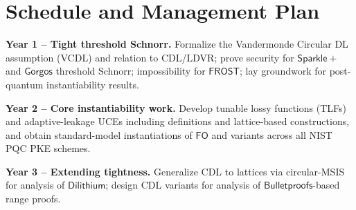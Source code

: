 \section{Schedule and Management Plan}


\begin{newitemize}
  \item \textbf{Year 1 – Tight threshold Schnorr.} 
  Formalize the Vandermonde Circular DL assumption (VCDL) and relation to CDL/LDVR; 
  prove security for $\mathsf{Sparkle+}$ and $\mathsf{Gorgos}$ threshold Schnorr; impossibility for $\mathsf{FROST}$; 
  lay groundwork for post-quantum instantiability results.

  \item \textbf{Year 2 – Core instantiability work.} 
  Develop tunable lossy functions (TLFs) and adaptive-leakage UCEs including definitions and lattice-based constructions, and obtain standard-model instantiations of $\mathsf{FO}$ and variants 
  across all NIST PQC PKE schemes. 

  \item \textbf{Year 3 – Extending  tightness.} 
  Generalize CDL to lattices via circular-MSIS for analysis of $\mathsf{Dilithium}$; 
  design CDL variants for analysis of $\mathsf{Bulletproofs}$-based range proofs. 
\end{newitemize}


